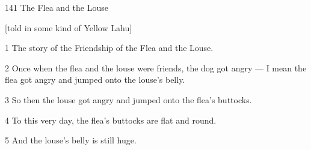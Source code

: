 
141 The Flea and the Louse

[told in some kind of Yellow Lahu]

1 The story of the Friendship of the Flea and the Louse.

2 Once when the flea and the louse were friends, the dog got angry --- I mean the
flea got angry and jumped onto the louse's belly.

3 So then the louse got angry and jumped onto the flea's buttocks.

4 To this very day, the flea's buttocks are flat and round.

5 And the louse's belly is still huge.


